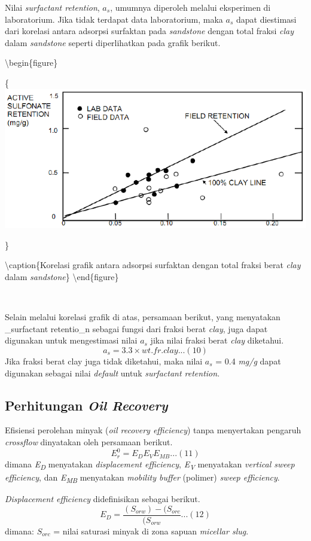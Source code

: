 \documentclass[
]{book}
\begin{document}
Nilai \emph{surfactant retention}, \(a_s\), umumnya diperoleh melalui eksperimen di laboratorium. Jika tidak terdapat data laboratorium, maka \(a_s\) dapat diestimasi dari korelasi antara adsorpsi surfaktan pada \emph{sandstone} dengan total fraksi \emph{clay} dalam \emph{sandstone} seperti diperlihatkan pada grafik berikut.

\textbackslash begin\{figure\}

\{\centering \includegraphics[width=0.5\linewidth]{images/chemical/adsorpsi}

\}

\textbackslash caption\{Korelasi grafik antara adsorpsi surfaktan dengan total fraksi berat \emph{clay} dalam \emph{sandstone}\}\label{fig:unnamed-chunk-55}
\textbackslash end\{figure\}

~

Selain melalui korelasi grafik di atas, persamaan berikut, yang menyatakan \_surfactant retentio\_n sebagai fungsi dari fraksi berat \emph{clay}, juga dapat digunakan untuk mengestimasi nilai \(a_s\) jika nilai fraksi berat \emph{clay} diketahui.
\[a_s = 3.3 \times wt.fr.clay ... (10)\]
Jika fraksi berat clay juga tidak diketahui, maka nilai \(a_s\) = 0.4 \emph{mg/g} dapat digunakan sebagai nilai \emph{default} untuk \emph{surfactant retention}.

\hypertarget{perhitungan-oil-recovery}{%
\subsection{\texorpdfstring{Perhitungan \emph{Oil Recovery}}{Perhitungan Oil Recovery}}\label{perhitungan-oil-recovery}}

Efisiensi perolehan minyak (\emph{oil recovery efficiency}) tanpa menyertakan pengaruh \emph{crossflow} dinyatakan oleh persamaan berikut.
\[E_r^0=E_DE_VE_{MB}...(11)\]
dimana \emph{E\textsubscript{D}} menyatakan \emph{displacement efficiency}, \emph{E\textsubscript{V}} menyatakan \emph{vertical sweep efficiency}, dan \emph{E\textsubscript{MB}} menyatakan \emph{mobility buffer} (polimer) \emph{sweep efficiency}.

\emph{Displacement efficiency} didefinisikan sebagai berikut.
\[E_D = \frac{(S_{orw})-(S_{orc}}{(S_{orw}}...(12)\]
dimana:
\(S_{orc}\) = nilai saturasi minyak di zona sapuan \emph{micellar slug}.
\end{document}
